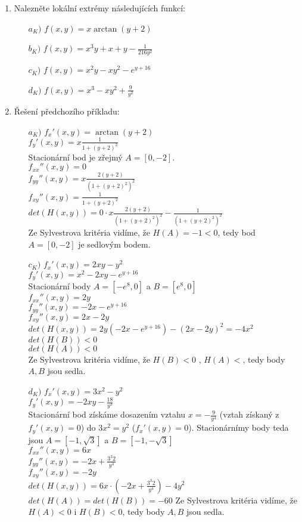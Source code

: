 \begin{enumerate}
\item Nalezněte lokální extrémy následujících funkcí:
\begin{enumerate}
    \item[$a_K)$]{$f(x,y)=x \arctan(y+2)$}
    \item[$b_K)$]{$f(x,y)=x^3y+x+y-\frac{1}{216y^2}$}
    \item[$c_K)$]{$f(x,y)=x^2y-xy^2-e^{y+16}$}
    \item[$d_K)$]{$f(x,y)=x^3-xy^2+\frac{9}{y^2}$}
\end{enumerate}
\item Řešení předchozího příkladu:
\begin{enumerate}
    \item[$a_K)$]{$f_x'(x,y)=\arctan(y+2)$\\
    $f_y'(x,y)=x\frac{1}{1+(y+2)^2}$\\
    Stacionární bod je zřejmý $A=[0,-2]$. \\
    $f_{xx}''(x,y)=0$\\
    $f_{yy}''(x,y)=x\frac{2(y+2)}{(1+(y+2)^2)^2}$\\
    $f_{xy}''(x,y)=\frac{1}{1+(y+2)^2}$\\
    $det(H(x,y))=0\cdot x\frac{2(y+2)}{(1+(y+2)^2)^2} -\frac{1}{(1+(y+2)^2)^2}$\\
    Ze Sylvestrova kritéria vidíme, že $H(A)=-1<0$, tedy bod $A=[0,-2]$ je sedlovým bodem.}
    \item[$c_K)$]{
    $f_x'(x,y)=2xy-y^2$\\
    $f_y'(x,y)=x^2-2xy-e^{y+16}$\\
    Stacionární body $A=[-e^8,0]$ a $B=[e^8,0]$\\
    $f_{xx}''(x,y)=2y$\\
    $f_{yy}''(x,y)=-2x-e^{y+16}$\\
    $f_{xy}''(x,y)=2x-2y$\\
    $det(H(x,y))=2y (-2x-e^{y+16})-(2x-2y)^2=-4x^2$\\
    $det(H(B))<0$ \\
    $det(H(A))<0$ \\
    Ze Sylvestrova kritéria vidíme, že $H(B)<0$ , $H(A)<$, tedy body $A,B$ jsou sedla.
    }
    \item[$d_K)$]{$f_x'(x,y)=3x^2-y^2$\\
    $f_y'(x,y)=-2xy-\frac{18}{y^3}$\\
    Stacionární bod získáme dosazením vztahu $x=-\frac{9}{y^4}$ (vztah získaný z $f_y'(x,y)=0$) do $3x^2=y^2$ ($f_x'(x,y)=0$). Stacionárnímy body teda jsou $A=[-1,\sqrt{3}]$ a $B=[-1,-\sqrt{3}]$\\
    $f_{xx}''(x,y)=6x$\\
    $f_{yy}''(x,y)=-2x+\frac{3^3 2}{y^4}$\\
    $f_{xy}''(x,y)=-2y$\\
    $det(H(x,y))=6x \cdot (-2x+\frac{3^3 2}{y^4}) -4y^2$\\
    $det(H(A))=det(H(B))=-60$
    Ze Sylvestrova kritéria vidíme, že $H(A)<0$ i $H(B)<0$, tedy body $A,B$ jsou sedla.}
    
\end{enumerate}

\end{enumerate}